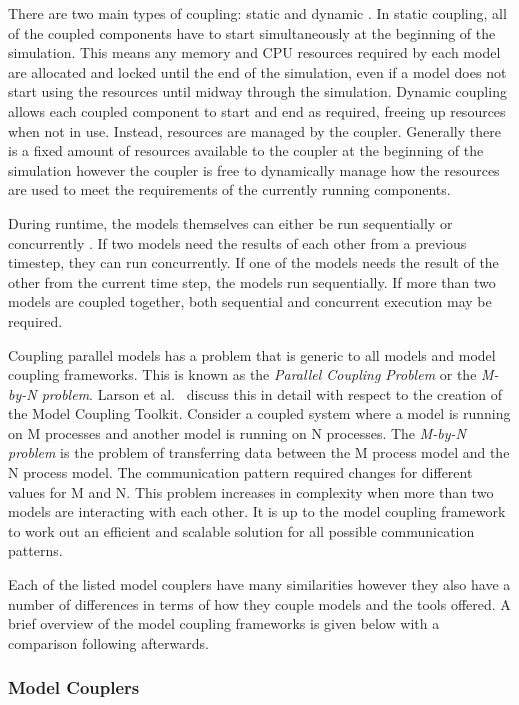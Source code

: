 There are two main types of coupling: static and dynamic
\cite{Thevenin,Piacentini2011}. In static coupling, all of the coupled
components have to start simultaneously at the beginning of the simulation. This
means any memory and CPU resources required by each model are allocated and
locked until the end of the simulation, even if a model does not start using the
resources until midway through the simulation. Dynamic coupling allows each
coupled component to start and end as required, freeing up resources when not in
use. Instead, resources are managed by the coupler. Generally there is a fixed
amount of resources available to the coupler at the beginning of the simulation
however the coupler is free to dynamically manage how the resources are used to
meet the requirements of the currently running components.

During runtime, the models themselves can either be run sequentially or
concurrently \cite{Maisonnave}. If two models need the results of each other
from a previous timestep, they can run concurrently. If one of the models needs
the result of the other from the current time step, the models run sequentially.
If more than two models are coupled together, both sequential and concurrent
execution may be required.

Coupling parallel models has a problem that is generic to all models and model
coupling frameworks. This is known as the \textit{Parallel Coupling Problem} or
the \textit{M-by-N problem}. Larson et al.\ \cite{Larson2005,Jacob2005} discuss
this in detail with respect to the creation of the Model Coupling Toolkit.
Consider a coupled system where a model is running on M processes and another
model is running on N processes. The \textit{M-by-N problem} is the problem of
transferring data between the M process model and the N process model. The
communication pattern required changes for different values for M and N. This
problem increases in complexity when more than two models are interacting with
each other. It is up to the model coupling framework to work out an efficient
and scalable solution for all possible communication patterns.

Each of the listed model couplers have many similarities however they also have
a number of differences in terms of how they couple models and the tools
offered. A brief overview of the model coupling frameworks is given below with a
comparison following afterwards.

\subsubsection{Model Couplers}

